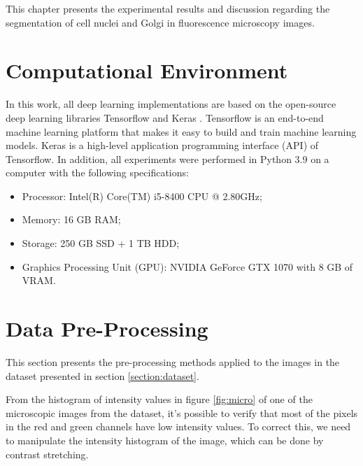 \cleardoublepage
\label{chap:results}


This chapter presents the experimental results and discussion regarding the segmentation of cell nuclei and Golgi in fluorescence microscopy images.


\section{Computational Environment}

In this work, all deep learning implementations are based on the open-source deep learning libraries Tensorflow and Keras \cite{tensorflow,keras}. Tensorflow is an end-to-end machine learning platform that makes it easy to build and train machine learning models. Keras is a high-level application programming interface (API) of Tensorflow. In addition, all experiments were performed in Python 3.9 on a computer with the following specifications:

\begin{itemize}
    \itemsep0em 
    \item Processor: Intel(R) Core(TM) i5-8400 CPU @ 2.80GHz;
    \item Memory: 16 GB RAM;
    \item Storage: 250 GB SSD + 1 TB HDD;
    \item Graphics Processing Unit (GPU): NVIDIA GeForce GTX 1070 with 8 GB of VRAM.
\end{itemize}


\section{Data Pre-Processing}
\label{section:pre}
This section presents the pre-processing methods applied to the images in the dataset presented in section \ref{section:dataset}.

From the histogram of intensity values in figure \ref{fig:micro} of one of the microscopic images from the dataset, it's possible to verify that most of the pixels in the red and green channels have low intensity values. To correct this, we need to manipulate the intensity histogram of the image, which can be done by contrast stretching.

